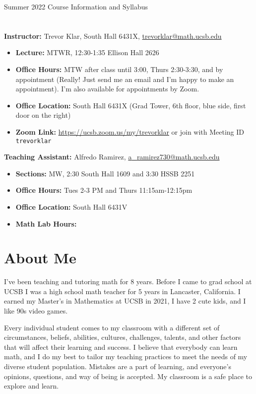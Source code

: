 \documentclass[11pt,letterpaper]{article}
\begin{document}
\thispagestyle{fancy}
\begin{center}
{\Large Summer 2022 Course Information and Syllabus}
\end{center}

\section*{}
\textbf{Instructor:} Trevor Klar, South Hall 6431X, \href{mailto:trevorklar@math.ucsb.edu}{trevorklar@math.ucsb.edu}
\begin{itemize}[nosep]
\item \textbf{Lecture:} MTWR, 12:30-1:35 Ellison Hall 2626
\item \textbf{Office Hours:}  MTW after class until 3:00, Thurs 2:30-3:30, and by appointment (Really! Just send me an email and I'm happy to make an appointment). I'm also available for appointments by Zoom.
\item \textbf{Office Location:} South Hall 6431X (Grad Tower, 6th floor, blue side, first door on the right)
\item \textbf{Zoom Link:} \href{https://ucsb.zoom.us/my/trevorklar}{https://ucsb.zoom.us/my/trevorklar} or join with Meeting ID \texttt{trevorklar}
\end{itemize}
\noindent \textbf{Teaching Assistant:} Alfredo Ramirez, \href{mailto:a_ramirez730@math.ucsb.edu}{a{\_}ramirez730@math.ucsb.edu}
\begin{itemize}[nosep]
\item \textbf{Sections:} MW, 2:30 South Hall 1609 and 3:30 HSSB 2251
\item \textbf{Office Hours:} Tues 2-3 PM and Thurs 11:15am-12:15pm
\item \textbf{Office Location:} South Hall 6431V
\item \textbf{Math Lab Hours:}
\end{itemize}

\section*{About Me}
I've been teaching and tutoring math for 8 years. Before I came to grad school at UCSB I was a high school math teacher for 5 years in Lancaster, California. I earned my Master's in Mathematics at UCSB in 2021, I have 2 cute kids, and I like 90s video games.

Every individual student comes to my classroom with a different set of circumstances, beliefs, abilities, cultures, challenges, talents, and other factors that will affect their learning and success. I believe that everybody can learn math, and I do my best to tailor my teaching practices to meet the needs of my diverse student population. Mistakes are a part of learning, and everyone's opinions, questions, and way of being is accepted. My classroom is a safe place to explore and learn.
\end{document}
